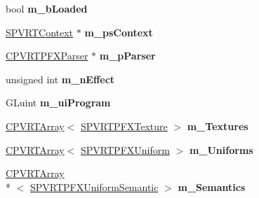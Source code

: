 \begin{DoxyCompactItemize}
\item 
\hypertarget{class_c_p_v_r_t_p_f_x_effect_ab12644ddc3b426ca11a09ddda24847c3}{bool {\bfseries m\+\_\+b\+Loaded}}\label{class_c_p_v_r_t_p_f_x_effect_ab12644ddc3b426ca11a09ddda24847c3}

\item 
\hypertarget{class_c_p_v_r_t_p_f_x_effect_a6d3c027f051810ba226e43eb262872da}{\hyperlink{struct_s_p_v_r_t_context}{S\+P\+V\+R\+T\+Context} $\ast$ {\bfseries m\+\_\+ps\+Context}}\label{class_c_p_v_r_t_p_f_x_effect_a6d3c027f051810ba226e43eb262872da}

\item 
\hypertarget{class_c_p_v_r_t_p_f_x_effect_a9311c47c27000a82503b00036955c3c4}{\hyperlink{class_c_p_v_r_t_p_f_x_parser}{C\+P\+V\+R\+T\+P\+F\+X\+Parser} $\ast$ {\bfseries m\+\_\+p\+Parser}}\label{class_c_p_v_r_t_p_f_x_effect_a9311c47c27000a82503b00036955c3c4}

\item 
\hypertarget{class_c_p_v_r_t_p_f_x_effect_a7f10d8c173ce28907d336dbc4c05e74d}{unsigned int {\bfseries m\+\_\+n\+Effect}}\label{class_c_p_v_r_t_p_f_x_effect_a7f10d8c173ce28907d336dbc4c05e74d}

\item 
\hypertarget{class_c_p_v_r_t_p_f_x_effect_a4f842c3a525b0ccbdebbead196e18b36}{G\+Luint {\bfseries m\+\_\+ui\+Program}}\label{class_c_p_v_r_t_p_f_x_effect_a4f842c3a525b0ccbdebbead196e18b36}

\item 
\hypertarget{class_c_p_v_r_t_p_f_x_effect_a298e2fd65258370518c4ac1670681520}{\hyperlink{class_c_p_v_r_t_array}{C\+P\+V\+R\+T\+Array}$<$ \hyperlink{struct_s_p_v_r_t_p_f_x_texture}{S\+P\+V\+R\+T\+P\+F\+X\+Texture} $>$ {\bfseries m\+\_\+\+Textures}}\label{class_c_p_v_r_t_p_f_x_effect_a298e2fd65258370518c4ac1670681520}

\item 
\hypertarget{class_c_p_v_r_t_p_f_x_effect_a741d6896eeb3b740028dbc8e29c73eac}{\hyperlink{class_c_p_v_r_t_array}{C\+P\+V\+R\+T\+Array}$<$ \hyperlink{struct_s_p_v_r_t_p_f_x_uniform}{S\+P\+V\+R\+T\+P\+F\+X\+Uniform} $>$ {\bfseries m\+\_\+\+Uniforms}}\label{class_c_p_v_r_t_p_f_x_effect_a741d6896eeb3b740028dbc8e29c73eac}

\item 
\hypertarget{class_c_p_v_r_t_p_f_x_effect_aca70e6d60db356114e46c86bcb7c35f6}{\hyperlink{class_c_p_v_r_t_array}{C\+P\+V\+R\+T\+Array}\\*
$<$ \hyperlink{struct_s_p_v_r_t_p_f_x_uniform_semantic}{S\+P\+V\+R\+T\+P\+F\+X\+Uniform\+Semantic} $>$ {\bfseries m\+\_\+\+Semantics}}\label{class_c_p_v_r_t_p_f_x_effect_aca70e6d60db356114e46c86bcb7c35f6}

\end{DoxyCompactItemize}


